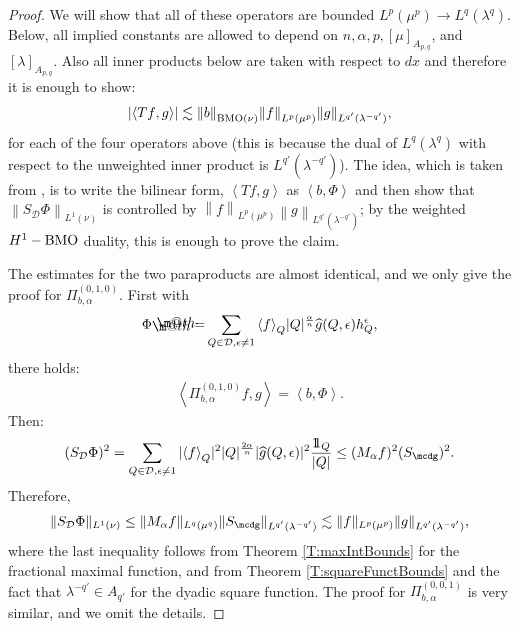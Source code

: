 \documentclass[12pt]{amsart}
\begin{document}
\begin{proof}
We will show that all of these operators are bounded 
$L^p(\mu^p) \rightarrow L^q({\lambda}^q)$. Below, all implied 
constants are allowed to depend on $n, \alpha, p, 
[\mu]_{A_{p,q}}$, and $[{\lambda}]_{A_{p,q}}$. Also all inner products
below are taken with respect to $dx$ and therefore it
is enough to show:
\begin{align*}
\left \vert {\ensuremath{\left\langle{Tf},{g}\right\rangle}}\right\vert
\lesssim {\ensuremath{\left\|{b}\right\|}}_{{\textnormal{BMO}}(\nu)}{\ensuremath{\left\|{f}\right\|}}_{L^p(\mu^p)}
  {\ensuremath{\left\|{g}\right\|}}_{L^{q'}(\lambda^{-q'})},
\end{align*}
for each of the four operators above (this is because the dual
of $L^q(\lambda^q)$ with respect to the unweighted inner product 
is $L^{q'}(\lambda^{-q'})$). The idea, which is
taken from \cites{HolLacWic2015a,HolLacWic2015b}, is to
write the bilinear form, ${\ensuremath{\left\langle{Tf},{g}\right\rangle}}$ as 
${\ensuremath{\left\langle{b},{\Phi}\right\rangle}}$ and then show that ${\ensuremath{\left\|{S_{{\mathcal{{D}}}}\Phi}\right\|}}_{L^1(\nu)}$ 
is controlled by ${\ensuremath{\left\|{f}\right\|}}_{L^p(\mu^p)} 
{\ensuremath{\left\|{g}\right\|}}_{L^{q'}(\lambda^{-q'})}$; by the weighted $H^1-{\textnormal{BMO}}$ duality, 
this is enough to prove the claim. 

The estimates for the two paraproducts are almost identical, and 
we only give the proof for $\Pi_{b,\alpha}^{(0,1,0)}$. First
with
\begin{align*}
\Phi {\mathrel{\rlap{                     \raisebox{0.3ex}{$\m@th\cdot$}}                     \raisebox{-0.3ex}{$\m@th\cdot$}}                     =} \sum_{Q\in{\mathcal{D}},{\epsilon}\neq 1} 
  {\langle {f} \rangle}_Q |Q|^{\frac{\alpha}{n}} \widehat{g}(Q,{\epsilon}) h_Q^{\epsilon},
\end{align*}
there holds:
\begin{align*}
{\ensuremath{\left\langle{\Pi_{b,\alpha}^{(0,1,0)}f},{g}\right\rangle}}={\ensuremath{\left\langle{b},{\Phi}\right\rangle}}.
\end{align*}
Then:
\begin{align*}
(S_{\mathcal{D}}\Phi)^2 = 
  \sum_{Q\in{\mathcal{D}},{\epsilon}\neq 1} 
  |{\langle } f{\rangle }_Q|^2 |Q|^{\frac{2\alpha}{n}} 
  |\widehat{g}(Q,{\epsilon})|^2 \frac{{1\!\!1}_Q}{|Q|} 
  \leq (M_{\alpha}f)^2 (S_\mcdg)^2.
\end{align*}
Therefore,
\begin{align*}
\|S_{\mathcal{D}}\Phi\|_{L^1(\nu)} 
  \leq \|M_{\alpha}f\|_{L^q(\mu^q)} \|S_\mcdg\|_{L^{q'}({\lambda}^{-q'})} 
  \lesssim \|f\|_{L^p(\mu^p)} \|g\|_{L^{q'}({\lambda}^{-q'})},
\end{align*}
where the last inequality follows from Theorem \ref{T:maxIntBounds} 
for the fractional maximal function, and from 
Theorem \ref{T:squareFunctBounds} and the fact 
that ${\lambda}^{-q'} \in A_{q'}$ for the dyadic square function. 
The proof for $\Pi_{b, \alpha}^{(0,0,1)}$ is very similar, and
we omit the details. 


\end{proof}
\end{document}
